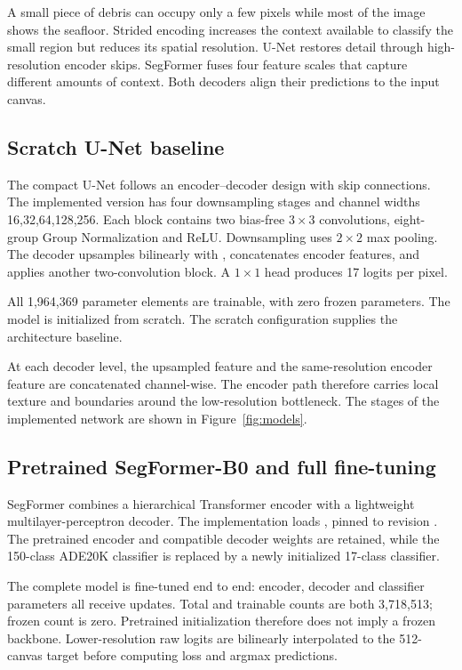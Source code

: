 A small piece of debris can occupy only a few pixels while most of the image shows the seafloor. Strided encoding increases the context available to classify the small region but reduces its spatial resolution. U-Net restores detail through high-resolution encoder skips. SegFormer fuses four feature scales that capture different amounts of context. Both decoders align their predictions to the input canvas.

\clearpage
\subsection{Scratch U-Net baseline}
The compact U-Net follows an encoder--decoder design with skip connections\cite{unet}. The implemented version has four downsampling stages and channel widths 16,32,64,128,256. Each block contains two bias-free $3\times 3$ convolutions, eight-group Group Normalization and ReLU. Downsampling uses $2\times 2$ max pooling. The decoder upsamples bilinearly with , concatenates encoder features, and applies another two-convolution block. A $1\times 1$ head produces 17 logits per pixel.

All 1,964,369 parameter elements are trainable, with zero frozen parameters. The model is initialized from scratch. The scratch configuration supplies the architecture baseline.

At each decoder level, the upsampled feature and the same-resolution encoder feature are concatenated channel-wise. The encoder path therefore carries local texture and boundaries around the low-resolution bottleneck. The stages of the implemented network are shown in Figure~\ref{fig:models}.

\subsection{Pretrained SegFormer-B0 and full fine-tuning}
SegFormer combines a hierarchical Transformer encoder with a lightweight multilayer-perceptron decoder\cite{segformer}. The implementation loads , pinned to revision . The pretrained encoder and compatible decoder weights are retained, while the 150-class ADE20K classifier is replaced by a newly initialized 17-class classifier.

The complete model is fine-tuned end to end: encoder, decoder and classifier parameters all receive updates. Total and trainable counts are both 3,718,513; frozen count is zero. Pretrained initialization therefore does not imply a frozen backbone. Lower-resolution raw logits are bilinearly interpolated to the 512-canvas target before computing loss and argmax predictions.

